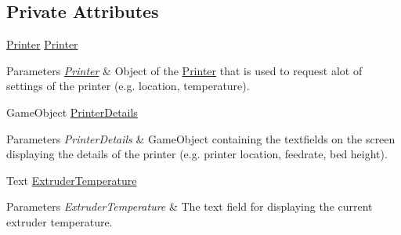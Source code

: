 \subsection*{Private Attributes}
\begin{DoxyCompactItemize}
\item 
\mbox{\label{class_u_i_controller_aac3690fd6f0e8307161343244e8ff125}} 
\hyperlink{class_printer}{Printer} \hyperlink{class_u_i_controller_aac3690fd6f0e8307161343244e8ff125}{Printer}
\begin{DoxyCompactList}\small\item\em 
\begin{DoxyParams}{Parameters}
{\em \hyperlink{class_printer}{Printer}} & Object of the \hyperlink{class_printer}{Printer} that is used to request alot of settings of the printer (e.\+g. location, temperature).\\
\hline
\end{DoxyParams}
\end{DoxyCompactList}\item 
\mbox{\label{class_u_i_controller_a1e06990406e89de41c6c8295ecd7870b}} 
Game\+Object \hyperlink{class_u_i_controller_a1e06990406e89de41c6c8295ecd7870b}{Printer\+Details}
\begin{DoxyCompactList}\small\item\em 
\begin{DoxyParams}{Parameters}
{\em Printer\+Details} & Game\+Object containing the textfields on the screen displaying the details of the printer (e.\+g. printer location, feedrate, bed height).\\
\hline
\end{DoxyParams}
\end{DoxyCompactList}\item 
\mbox{\label{class_u_i_controller_a83aa464d971eff4f74cfb5891661693d}} 
Text \hyperlink{class_u_i_controller_a83aa464d971eff4f74cfb5891661693d}{Extruder\+Temperature}
\begin{DoxyCompactList}\small\item\em 
\begin{DoxyParams}{Parameters}
{\em Extruder\+Temperature} & The text field for displaying the current extruder temperature.\\
\hline
\end{DoxyParams}
\end{DoxyCompactList}\item 

\end{DoxyCompactItemize}
